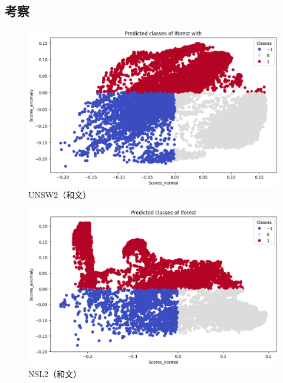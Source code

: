 \documentclass{css}
\begin{document}
\subsection{考察}

\begin{figure}
    \centering
    \includegraphics[width=\linewidth]{pictures/eps/UNSW2.eps}
    \caption{UNSW2（和文）}
    \label{fig:UNSW2}
\end{figure}

\begin{figure}
    \centering
    \includegraphics[width=\linewidth]{pictures/eps/NSL2.eps}
    \caption{NSL2（和文）}
    \label{fig:NSL2}
\end{figure}
\end{document}
